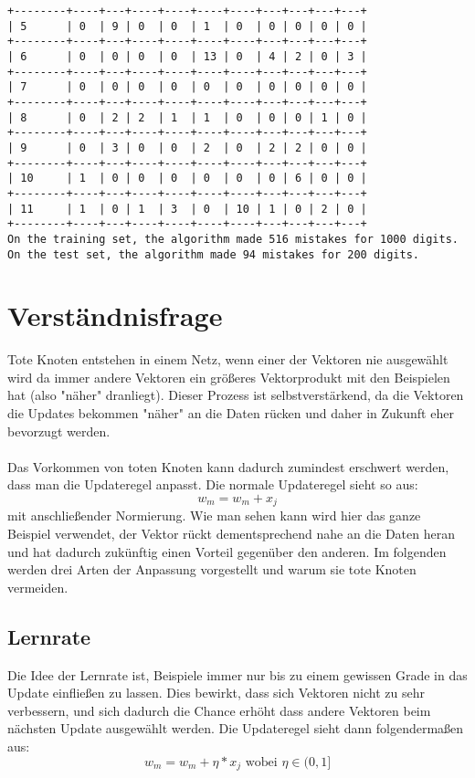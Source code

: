 \documentclass{article}
\begin{document}
\begin{lstlisting}[title=Beispielausgabe]
+--------+----+---+----+----+----+----+---+---+---+---+
| 5      | 0  | 9 | 0  | 0  | 1  | 0  | 0 | 0 | 0 | 0 |
+--------+----+---+----+----+----+----+---+---+---+---+
| 6      | 0  | 0 | 0  | 0  | 13 | 0  | 4 | 2 | 0 | 3 |
+--------+----+---+----+----+----+----+---+---+---+---+
| 7      | 0  | 0 | 0  | 0  | 0  | 0  | 0 | 0 | 0 | 0 |
+--------+----+---+----+----+----+----+---+---+---+---+
| 8      | 0  | 2 | 2  | 1  | 1  | 0  | 0 | 0 | 1 | 0 |
+--------+----+---+----+----+----+----+---+---+---+---+
| 9      | 0  | 3 | 0  | 0  | 2  | 0  | 2 | 2 | 0 | 0 |
+--------+----+---+----+----+----+----+---+---+---+---+
| 10     | 1  | 0 | 0  | 0  | 0  | 0  | 0 | 6 | 0 | 0 |
+--------+----+---+----+----+----+----+---+---+---+---+
| 11     | 1  | 0 | 1  | 3  | 0  | 10 | 1 | 0 | 2 | 0 |
+--------+----+---+----+----+----+----+---+---+---+---+
On the training set, the algorithm made 516 mistakes for 1000 digits.
On the test set, the algorithm made 94 mistakes for 200 digits.
\end{lstlisting}

\section{Verständnisfrage}
Tote Knoten entstehen in einem Netz, wenn einer der Vektoren nie ausgewählt wird da immer andere Vektoren ein größeres Vektorprodukt mit den Beispielen hat (also "näher" dranliegt). Dieser Prozess ist selbstverstärkend, da die Vektoren die Updates bekommen "näher" an die Daten rücken und daher in Zukunft eher bevorzugt werden.
\paragraph{}
Das Vorkommen von toten Knoten kann dadurch zumindest erschwert werden, dass man die Updateregel anpasst. Die normale Updateregel sieht so aus:
\[
	w_m = w_m + x_j
\]
mit anschließender Normierung. Wie man sehen kann wird hier das ganze Beispiel verwendet, der Vektor rückt dementsprechend nahe an die Daten heran und hat dadurch zukünftig einen Vorteil gegenüber den anderen. Im folgenden werden drei Arten der Anpassung vorgestellt und warum sie tote Knoten vermeiden.

\subsection{Lernrate}
Die Idee der Lernrate ist, Beispiele immer nur bis zu einem gewissen Grade in das Update einfließen zu lassen. Dies bewirkt, dass sich Vektoren nicht zu sehr verbessern, und sich dadurch die Chance erhöht dass andere Vektoren beim nächsten Update ausgewählt werden. Die Updateregel sieht dann folgendermaßen aus:
\[
	w_m = w_m + \eta * x_j \textrm{ wobei } \eta \in (0,1]
\]
\end{document}
